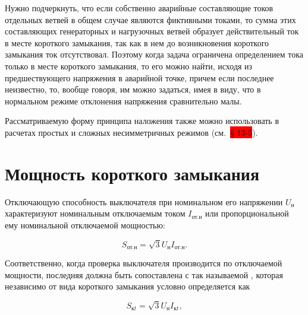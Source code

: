 Нужно подчеркнуть, что если собственно аварийные составляющие токов отдельных ветвей в общем случае являются фиктивными токами, то сумма этих составляющих генераторных и нагрузочных ветвей образует действительный ток в месте короткого замыкания, так как в нем до возникновения короткого замыкания ток отсутствовал. Поэтому когда задача ограничена определением тока только в месте короткого замыкания, то его можно найти, исходя из предшествующего напряжения в аварийной точке, причем если последнее неизвестно, то, вообще говоря, им можно задаться, имея в виду, что в нормальном режиме отклонения напряжения сравнительно малы.

Рассматриваемую форму принципа наложения также можно использовать в расчетах простых и сложных несимметричных режимов (см.~\colorbox{red}{§ 13-5}).
























\section{Мощность короткого замыкания}
\label{sec:2-7 moshchnost korotkogo zamykaniia}

Отключающую способность выключателя при номинальном его напряжении $ U_{\text{н}} $ характеризуют номинальным отключаемым током $ I_{\text{от.н}} $ или пропорциональной ему номинальной отключаемой мощностью:

\begin{equation*}
	S_{\text{от.н}} = \sqrt{3}U_{\text{н}}I_{\text{от.н}}.
\end{equation*}

Соответственно, когда проверка выключателя производится по отключаемой мощности, последняя должна быть сопоставлена с так называемой , которая независимо от вида короткого замыкания условно определяется как

\begin{equation} %
	\label{eq:2-38 S_kz_v_moment_t}
	S_{\text{к}t} = \sqrt{3}U_{\text{н}}I_{\text{к}t},
\end{equation}


